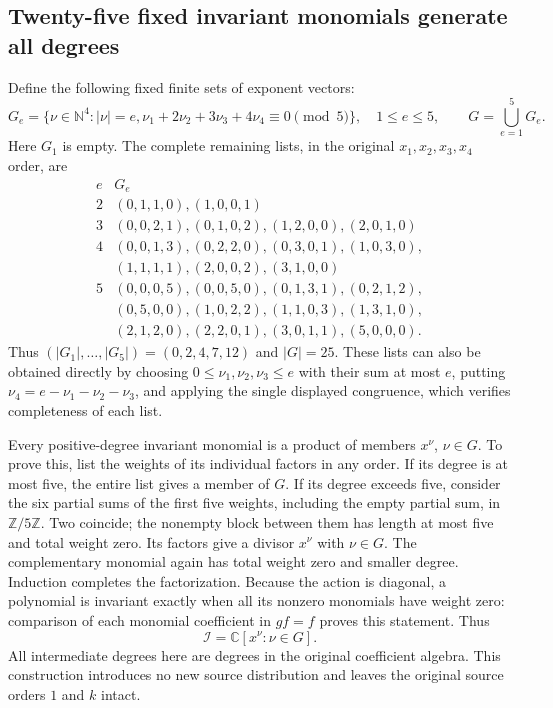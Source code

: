 \documentclass[11pt]{article}
\begin{document}
\subsection{Twenty-five fixed invariant monomials generate all degrees}

Define the following fixed finite sets of exponent vectors:
\[
 G_e=\{\nu\in\mathbb N^4:|\nu|=e,
                   \nu_1+2\nu_2+3\nu_3+4\nu_4\equiv0\pmod5\},
 \quad 1\leq e\leq5,\qquad G=\bigcup_{e=1}^5G_e.
 \tag{OCF9}
\]
Here $G_1$ is empty. The complete remaining lists, in the original
$x_1,x_2,x_3,x_4$ order, are
\[
\begin{array}{c|l}
e&G_e\\\hline
2&(0,1,1,0),(1,0,0,1)\\
3&(0,0,2,1),(0,1,0,2),(1,2,0,0),(2,0,1,0)\\
4&(0,0,1,3),(0,2,2,0),(0,3,0,1),(1,0,3,0),\\
 & (1,1,1,1),(2,0,0,2),(3,1,0,0)\\
5&(0,0,0,5),(0,0,5,0),(0,1,3,1),(0,2,1,2),\\
 & (0,5,0,0),(1,0,2,2),(1,1,0,3),(1,3,1,0),\\
 & (2,1,2,0),(2,2,0,1),(3,0,1,1),(5,0,0,0).
\end{array}\tag{OCF10}
\]
Thus $(|G_1|,\ldots,|G_5|)=(0,2,4,7,12)$ and $|G|=25$.
These lists can also be obtained directly by choosing
$0\leq\nu_1,\nu_2,\nu_3\leq e$ with their sum at most $e$,
putting $\nu_4=e-\nu_1-\nu_2-\nu_3$, and applying the single
displayed congruence, which verifies completeness of each list.

Every positive-degree invariant monomial is a product of members
$x^\nu$, $\nu\in G$. To prove this, list the weights of its
individual factors in any order. If its degree is at most five,
the entire list gives a member of $G$. If its degree exceeds five,
consider the six partial sums of the first five weights, including
the empty partial sum, in $\mathbb Z/5\mathbb Z$. Two coincide;
the nonempty block between them has length at most five and total
weight zero. Its factors give a divisor $x^\nu$ with $\nu\in G$.
The complementary monomial again has total weight zero and smaller
degree. Induction completes the factorization. Because the action
is diagonal, a polynomial is invariant exactly when all its
nonzero monomials have weight zero: comparison of each monomial
coefficient in $gf=f$ proves this statement. Thus
\[
                \mathscr I=\mathbb C[x^\nu:\nu\in G].
 \tag{OCF11}
\]
All intermediate degrees here are degrees in the original
coefficient algebra. This construction introduces no new source
distribution and leaves the original source orders $1$ and $k$ intact.
\end{document}
